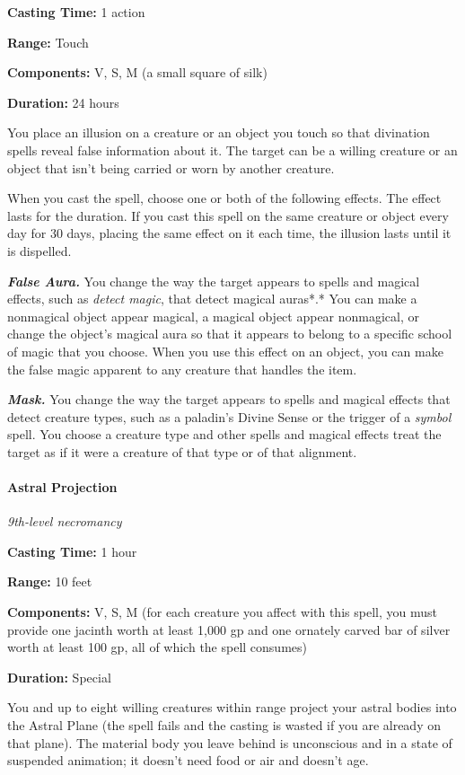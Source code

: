 \documentclass[
]{article}
\begin{document}
\textbf{Casting Time:} 1 action

\textbf{Range:} Touch

\textbf{Components:} V, S, M (a small square of silk)

\textbf{Duration:} 24 hours

You place an illusion on a creature or an object you touch so that
divination spells reveal false information about it. The target can be a
willing creature or an object that isn't being carried or worn by
another creature.

When you cast the spell, choose one or both of the following effects.
The effect lasts for the duration. If you cast this spell on the same
creature or object every day for 30 days, placing the same effect on it
each time, the illusion lasts until it is dispelled.

\emph{\textbf{False Aura.}} You change the way the target appears to
spells and magical effects, such as \emph{detect magic}, that detect
magical auras*.* You can make a nonmagical object appear magical, a
magical object appear nonmagical, or change the object's magical aura so
that it appears to belong to a specific school of magic that you choose.
When you use this effect on an object, you can make the false magic
apparent to any creature that handles the item.

\emph{\textbf{Mask.}} You change the way the target appears to spells
and magical effects that detect creature types, such as a paladin's
Divine Sense or the trigger of a \emph{symbol} spell. You choose a
creature type and other spells and magical effects treat the target as
if it were a creature of that type or of that alignment.

\hypertarget{astral-projection}{%
\paragraph{Astral Projection}\label{astral-projection}}

\emph{9th-level necromancy}

\textbf{Casting Time:} 1 hour

\textbf{Range:} 10 feet

\textbf{Components:} V, S, M (for each creature you affect with this
spell, you must provide one jacinth worth at least 1,000 gp and one
ornately carved bar of silver worth at least 100 gp, all of which the
spell consumes)

\textbf{Duration:} Special

You and up to eight willing creatures within range project your astral
bodies into the Astral Plane (the spell fails and the casting is wasted
if you are already on that plane). The material body you leave behind is
unconscious and in a state of suspended animation; it doesn't need food
or air and doesn't age.
\end{document}
